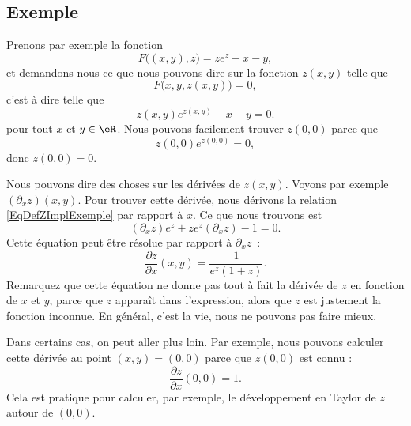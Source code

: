 \subsection{Exemple}

Prenons par exemple la fonction
\begin{equation}
	F\big( (x,y),z \big)=ze^z-x-y,
\end{equation}
et demandons nous ce que nous pouvons dire sur la fonction $z(x,y)$ telle que
\begin{equation}
	F\big( x,y,z(x,y) \big)=0,
\end{equation}
c'est à dire telle que
\begin{equation}		\label{EqDefZImplExemple}
	z(x,y) e^{z(x,y)}-x-y=0.
\end{equation}
pour tout $x$ et $y\in\eR$. Nous pouvons facilement trouver $z(0,0)$ parce que
\begin{equation}
	z(0,0) e^{z(0,0)}=0,
\end{equation}
donc $z(0,0)=0$.

Nous pouvons dire des choses sur les dérivées de $z(x,y)$. Voyons par exemple $(\partial_xz)(x,y)$. Pour trouver cette dérivée, nous dérivons la relation \eqref{EqDefZImplExemple} par rapport à $x$. Ce que nous trouvons est
\begin{equation}
	(\partial_xz)e^z+ze^z(\partial_xz)-1=0.
\end{equation}
Cette équation peut être résolue par rapport à $\partial_xz$~:
\begin{equation}
	\frac{ \partial z }{ \partial x }(x,y)=\frac{1}{ e^z(1+z) }.
\end{equation}
Remarquez que cette équation ne donne pas tout à fait la dérivée de $z$ en fonction de $x$ et $y$, parce que $z$ apparaît dans l'expression, alors que $z$ est justement la fonction inconnue. En général, c'est la vie, nous ne pouvons pas faire mieux.

Dans certains cas, on peut aller plus loin. Par exemple, nous pouvons calculer cette dérivée au point $(x,y)=(0,0)$ parce que $z(0,0)$ est connu :
\begin{equation}
	\frac{ \partial z }{ \partial x }(0,0)=1.
\end{equation}
Cela est pratique pour calculer, par exemple, le développement en Taylor de $z$ autour de $(0,0)$.

